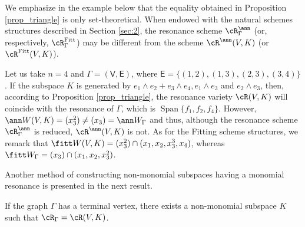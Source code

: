 \documentclass[10pt, leqno]{amsart}
\begin{document}
We emphasize in the example below that the equality obtained in Proposition \ref{prop_triangle} is only set-theoretical. When endowed with the natural schemes structures described in Section \ref{sec:2}, the resonance scheme $\cR^{\ann}_\Gamma$ (or, respectively, $\cR^{\operatorname{Fitt}}_\Gamma$) may be different from the scheme $\cR^{\ann}(V,K)$ (or $\cR^{\operatorname{Fitt}}(V,K)$).

\begin{exmp} \label{ex:non-reduced}
Let us take $n = 4$ and $\Gamma = (\mathsf{V}, \mathsf{E})$, where $\mathsf{E} = \{(1,2), (1,3), (2,3), (3,4) \}$. If the subspace $K$ is generated by $e_1 \wedge e_2 + e_3 \wedge e_4, e_1 \wedge e_3$ and $e_2 \wedge e_3$, then, according to Proposition \ref{prop_triangle}, the resonance variety $\cR(V,K)$ will coincide with the resonance of $\Gamma$, which is $\operatorname{Span}\{f_1, f_2, f_4\}$. However, $\ann W(V,K) = (x_3^2) \neq (x_3) = \ann W_\Gamma$ and thus, although the resonance scheme $\cR^{\ann}_\Gamma$ is reduced, $\cR^{\ann}(V,K)$ is not. As for the Fitting scheme structures, we remark that $\fitt W(V,K) = (x_3^2) \cap (x_1, x_2, x_3^3, x_4)$, whereas $\fitt W_\Gamma = (x_3) \cap (x_1, x_2, x_3^2)$.
\end{exmp}

Another method of constructing non-monomial subspaces having a monomial resonance is presented in the next result.

\begin{prop} \label{prop_terminal_vertex}
If the graph $\Gamma$ has a terminal vertex, there exists a non-monomial subspace $K$ such that $\cR_\Gamma = \cR(V,K)$.
\end{prop}
\end{document}
